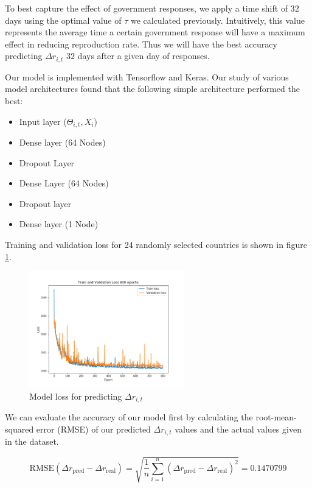 \documentclass[11pt]{article}
\begin{document}
To best capture the effect of government responses, we apply a time shift of $32$ days using the optimal value of $\tau$ we calculated previously. Intuitively, this value represents the average time a certain government response will have a maximum effect in reducing reproduction rate. Thus we will have the best accuracy predicting $\Delta r_{i,t}$ $32$ days after a given day of responses.

Our model is implemented with Tensorflow and Keras. Our study of various model architectures found that the following simple architecture performed the best:

\begin{itemize}
    \item Input layer ($\Theta_{i,t},X_i$)
    \item Dense layer (64 Nodes)
    \item Dropout Layer
    \item Dense Layer (64 Nodes)
    \item Dropout layer
    \item Dense layer (1 Node)
\end{itemize}

Training and validation loss for 24 randomly selected countries is shown in figure  \ref{fig:delta_reproduction_rate_model_loss}.

\begin{figure}[!htb]
     \centering
     \includegraphics[width=0.6\textwidth]{delta_reproduction_rate_model_loss.png}
     \caption{Model loss for predicting $\Delta r_{i,t}$}
     \label{fig:delta_reproduction_rate_model_loss}
\end{figure}

We can evaluate the accuracy of our model first by calculating the root-mean-squared error (RMSE) of our predicted $\Delta r_{i,t}$ values and the actual values given in the dataset.

$$\text{RMSE}(\Delta r_{\text{pred}} - \Delta r_{\text{real}}) = \sqrt{\frac{1}{n}\sum_{i=1}^{n}(\Delta r_{\text{pred}} - \Delta r_{\text{real}})^{2}} = 0.1470799$$
\end{document}
